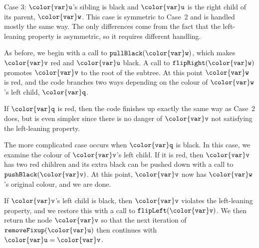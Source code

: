 \documentclass[10pt]{book}
\theoremstyle{plain}
\theoremstyle{definition}
\begin{document}
\noindent
Case 3: \ensuremath{\mathtt{{\color{var}u}}}'s sibling is black and \ensuremath{\mathtt{{\color{var}u}}} is the right child of its parent,
\ensuremath{\mathtt{{\color{var}w}}}.  This case is symmetric to Case~2 and is handled mostly the same way.
The only differences come from the fact that the left-leaning property
is asymmetric, so it requires different handling.

As before, we begin with a call to \ensuremath{\mathtt{pullBlack({\color{var}w})}}, which makes \ensuremath{\mathtt{{\color{var}v}}} red
and \ensuremath{\mathtt{{\color{var}u}}} black.  A call to \ensuremath{\mathtt{flipRight({\color{var}w})}} promotes \ensuremath{\mathtt{{\color{var}v}}} to the root of
the subtree.  At this point \ensuremath{\mathtt{{\color{var}w}}} is red, and the code branches two ways
depending on the colour of \ensuremath{\mathtt{{\color{var}w}}}'s left child, \ensuremath{\mathtt{{\color{var}q}}}.

If \ensuremath{\mathtt{{\color{var}q}}} is red, then the code finishes up exactly the same way as Case~2
does, but is even simpler since there is no danger of \ensuremath{\mathtt{{\color{var}v}}} not
satisfying the left-leaning property.

The more complicated case occurs when \ensuremath{\mathtt{{\color{var}q}}} is black.  In this case,
we examine the colour of \ensuremath{\mathtt{{\color{var}v}}}'s left child.  If it is red, then \ensuremath{\mathtt{{\color{var}v}}} has
two red children and its extra black can be pushed down with a call to
\ensuremath{\mathtt{pushBlack({\color{var}v})}}.  At this point, \ensuremath{\mathtt{{\color{var}v}}} now has \ensuremath{\mathtt{{\color{var}w}}}'s original colour, and we
are done.

If \ensuremath{\mathtt{{\color{var}v}}}'s left child is black, then \ensuremath{\mathtt{{\color{var}v}}} violates the left-leaning property,
and we restore this with a call to \ensuremath{\mathtt{flipLeft({\color{var}v})}}.  We then return the
node \ensuremath{\mathtt{{\color{var}v}}} so that the next iteration of \ensuremath{\mathtt{removeFixup({\color{var}u})}} then continues
with $\ensuremath{\mathtt{{\color{var}u}}}=\ensuremath{\mathtt{{\color{var}v}}}$.
\end{document}
